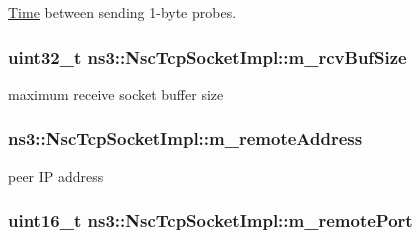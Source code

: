 \hyperlink{classns3_1_1Time}{Time} between sending 1-\/byte probes. 

\subsubsection[{\texorpdfstring{m\+\_\+rcv\+Buf\+Size}{m_rcvBufSize}}]{\setlength{\rightskip}{0pt plus 5cm}uint32\+\_\+t ns3\+::\+Nsc\+Tcp\+Socket\+Impl\+::m\+\_\+rcv\+Buf\+Size\hspace{0.3cm}{\ttfamily [private]}}\hypertarget{classns3_1_1NscTcpSocketImpl_a770df3b7830449d1296dd2ed56a5cf3b}{}\label{classns3_1_1NscTcpSocketImpl_a770df3b7830449d1296dd2ed56a5cf3b}


maximum receive socket buffer size 

\subsubsection[{\texorpdfstring{m\+\_\+remote\+Address}{m_remoteAddress}}]{ ns3\+::\+Nsc\+Tcp\+Socket\+Impl\+::m\+\_\+remote\+Address\hspace{0.3cm}{\ttfamily [private]}}\hypertarget{classns3_1_1NscTcpSocketImpl_aa61f63cf0fa0e3fe3e02a5a90224caf9}{}\label{classns3_1_1NscTcpSocketImpl_aa61f63cf0fa0e3fe3e02a5a90224caf9}


peer IP address 

\subsubsection[{\texorpdfstring{m\+\_\+remote\+Port}{m_remotePort}}]{\setlength{\rightskip}{0pt plus 5cm}uint16\+\_\+t ns3\+::\+Nsc\+Tcp\+Socket\+Impl\+::m\+\_\+remote\+Port\hspace{0.3cm}{\ttfamily [private]}}\hypertarget{classns3_1_1NscTcpSocketImpl_ad0094ba92f10c47bc783acf5c15026b7}{}\label{classns3_1_1NscTcpSocketImpl_ad0094ba92f10c47bc783acf5c15026b7}


